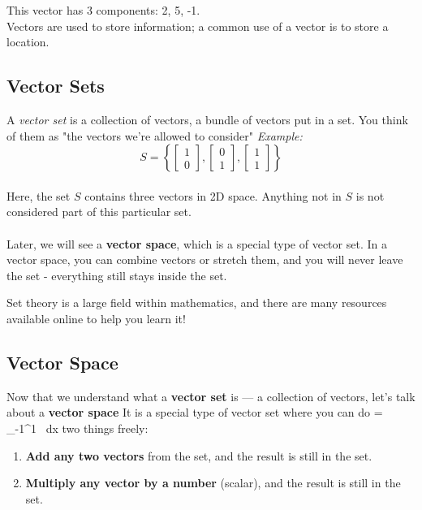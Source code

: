 \documentclass[12pt]{report}
\begin{document}
        This vector has 3 components: 2, 5, -1. \\
        Vectors are used to store information; a common use of a vector is to store a location.

        \subsection{Vector Sets}
            A \emph{vector set} is a collection of vectors, a bundle of vectors put in a set. You think of them as "the vectors we're allowed to consider"
            \emph{Example:} 
            \begin{equation}
                S = \left\{ 
                    \begin{bmatrix}1\\0\end{bmatrix}, 
                    \begin{bmatrix}0\\1\end{bmatrix}, 
                    \begin{bmatrix}1\\1\end{bmatrix} 
                    \right\}
            \end{equation}
            \\
            Here, the set $S$ contains three vectors in 2D space. Anything not in $S$ is not considered part of this particular set. 
            \\\\
            Later, we will see a \textbf{vector space}, which is a special type of vector set. In a vector space, you can combine vectors or stretch them, and you will never leave the set - everything still stays inside the set.

            Set theory is a large field within mathematics, and there are many resources available online to help you learn it!

        \subsection{Vector Space}
            Now that we understand what a \textbf{vector set} is — a collection of vectors, let's talk about a \textbf{vector space} It is a special type of vector set where you can do = \int_{-1}^{1} \ dx two things freely:

            \begin{enumerate}
                \item \textbf{Add any two vectors} from the set, and the result is still in the set.
                \item \textbf{Multiply any vector by a number} (scalar), and the result is still in the set.
            \end{enumerate}
\end{document}
